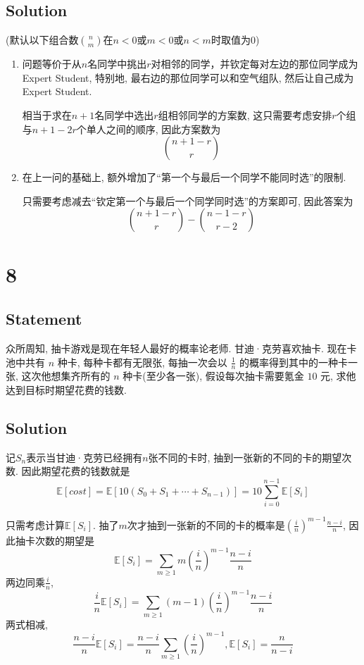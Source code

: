 \documentclass[UTF-8]{ctexart}
\begin{document}
\subsection*{Solution}
(默认以下组合数$\binom{n}{m}$在$n < 0$或$m < 0$或$n < m$时取值为$0$)
\begin{enumerate}
	\item 问题等价于从$n$名同学中挑出$r$对相邻的同学，并钦定每对左边的那位同学成为 Expert Student, 特别地, 最右边的那位同学可以和空气组队, 然后让自己成为 Expert Student.
	
	相当于求在$n+1$名同学中选出$r$组相邻同学的方案数, 这只需要考虑安排$r$个组与$n + 1 - 2r$个单人之间的顺序, 因此方案数为$$\binom{n + 1 - r}{r}$$
	
	\item 在上一问的基础上, 额外增加了“第一个与最后一个同学不能同时选”的限制.
	
	只需要考虑减去“钦定第一个与最后一个同学同时选”的方案即可, 因此答案为$$\binom{n + 1 - r}{r} - \binom{n - 1 - r}{r - 2}$$
	
\end{enumerate}

\section*{8}
\subsection*{Statement}
众所周知, 抽卡游戏是现在年轻人最好的概率论老师. 甘迪·克劳喜欢抽卡. 现在卡池中共有 $n$ 种卡, 每种卡都有无限张, 每抽一次会以 $\frac 1n$ 的概率得到其中的一种卡一张, 这次他想集齐所有的 $n$ 种卡(至少各一张), 假设每次抽卡需要氪金 $10$ 元, 求他达到目标时期望花费的钱数.
\subsection*{Solution}

记$S_n$表示当甘迪·克劳已经拥有$n$张不同的卡时, 抽到一张新的不同的卡的期望次数. 因此期望花费的钱数就是$$\mathbb E[cost] = \mathbb E[10(S_0 + S_1 + \cdots + S_{n-1})] = 10\sum_{i=0}^{n-1}\mathbb E[S_i]$$

只需考虑计算$\mathbb E[S_i]$. 抽了$m$次才抽到一张新的不同的卡的概率是$(\frac{i}{n})^{m-1}\frac{n-i}{n}$, 因此抽卡次数的期望是
\begin{equation}
\mathbb E[S_i] = \sum_{m \ge 1}m\left(\frac{i}{n}\right)^{m-1}\frac{n-i}{n}
\end{equation}
两边同乘$\frac{i}{n}$,
\begin{equation}
\frac{i}{n}\mathbb E[S_i] = \sum_{m \ge 1}(m-1)\left(\frac{i}{n}\right)^{m-1}\frac{n-i}{n}
\end{equation}
两式相减,
\begin{equation}
\frac{n-i}{n}\mathbb E[S_i] = \frac{n-i}{n}\sum_{m \ge 1}\left(\frac{i}{n}\right)^{m-1}, \mathbb E[S_i] = \frac{n}{n-i}
\end{equation}
\end{document}
